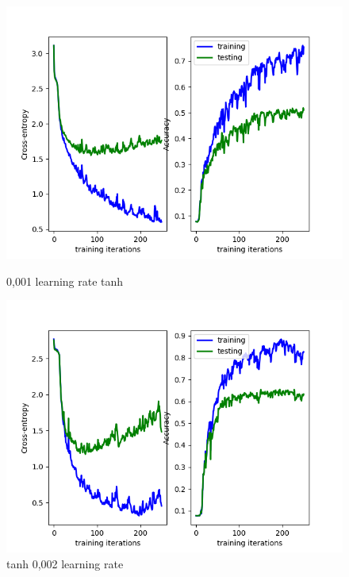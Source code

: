 \documentclass[11pt]{article} %
\begin{document}
\begin{figure}[H]
  \centering
  \begin{minipage}[b]{0.4\textwidth}
    \includegraphics[width=\textwidth]{images/1tanh0,001}
    \caption{0,001 learning rate tanh}
  \end{minipage}
  \hfill
  \begin{minipage}[b]{0.4\textwidth}
    \includegraphics[width=\textwidth]{images/1tanh0,002}
    \caption{tanh 0,002 learning rate}
  \end{minipage}
\end{figure}
\end{document}
